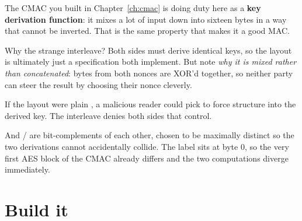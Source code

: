 The CMAC you built in Chapter~\ref{ch:cmac} is doing duty here as a \textbf{key
derivation function}: it mixes a lot of input down into sixteen bytes in a way
that cannot be inverted. That is the same property that makes it a good MAC.

\begin{deeper}{Why the strange interleave?}
Both sides must derive identical keys, so the layout is ultimately just a
specification both implement. But note \emph{why it is mixed rather than
concatenated}: bytes from both nonces are XOR'd together, so neither party can
steer the result by choosing their nonce cleverly.

If the layout were plain , a malicious reader could pick
 to force structure into the derived key. The interleave denies both
sides that control.

And / are bit-complements of each other, chosen to be
maximally distinct so the two derivations cannot accidentally collide. The label
sits at byte 0, so the very first AES block of the CMAC already differs and the
two computations diverge immediately.
\end{deeper}

\section{Build it}

